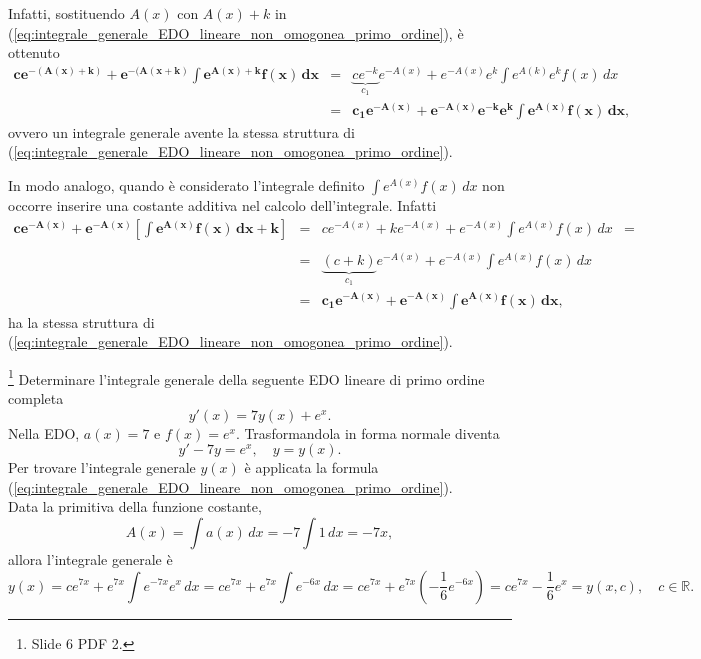 Infatti, sostituendo $A(x)$ con $A(x)+k$ in (\ref{eq:integrale_generale_EDO_lineare_non_omogonea_primo_ordine}), è ottenuto
\begin{equation*}
    \begin{matrix}
        \boldsymbol{ce^{-(A(x)+k)}+e^{-(A(x+k)}\int e^{A(x)+k}f(x)\, dx} &=& \underbrace{ce^{-k}}_{c_1}e^{-A(x)}+e^{-A(x)}e^{k}\int e^{A(k)} e^k f(x)\, dx\\
        &\boldsymbol=& \boldsymbol{c_1 e^{-A(x)}+e^{-A(x)} e^{-k}e^k\int e^{A(x)}f(x)\, dx,}
    \end{matrix}
\end{equation*}
ovvero un integrale generale avente la stessa struttura di (\ref{eq:integrale_generale_EDO_lineare_non_omogonea_primo_ordine}).

In modo analogo, quando è considerato l'integrale definito $\int e^{A(x)} f(x)\, dx$ non occorre inserire una costante additiva nel calcolo dell'integrale. Infatti
\begin{equation*}
    \begin{matrix}
        \boldsymbol{c e^{-A(x)}+e^{-A(x)}\left[\int e^{A(x)}f(x)\, dx+k\right]} &=& ce^{-A(x)}+ke^{-A(x)}+e^{-A(x)}\int e^{A(x)}f(x)\, dx &=&\\\\
        &=&\underbrace{(c+k)}_{c_1}e^{-A(x)} + e^{-A(x)}\int e^{A(x)}f(x)\, dx \\
        &\boldsymbol=& \boldsymbol{c_1 e^{-A(x)} + e^{-A(x)}\int e^{A(x)}f(x)\, dx},
    \end{matrix}
\end{equation*}
ha la stessa struttura di (\ref{eq:integrale_generale_EDO_lineare_non_omogonea_primo_ordine}).

\begin{example}\footnote{Slide 6 PDF 2.}
    Determinare l'integrale generale della seguente EDO lineare di primo ordine completa
    \begin{equation*}
        y'(x)=7y(x)+e^x.
    \end{equation*}
    Nella EDO, $a(x)=7$ e $f(x)=e^x$. Trasformandola in forma normale diventa
    \begin{equation*}
        y'-7y=e^x,\quad y=y(x).
    \end{equation*}
    Per trovare l'integrale generale $y(x)$ è applicata la formula (\ref{eq:integrale_generale_EDO_lineare_non_omogonea_primo_ordine}).\\
    Data la primitiva della funzione costante,
    \begin{equation*}
        A(x)=\int a(x)\, dx=-7\int 1\, dx=-7x,
    \end{equation*}
    allora l'integrale generale è
    \begin{equation*}
        y(x)=ce^{7x}+e^{7x}\int e^{-7x}e^x\, dx=ce^{7x}+e^{7x}\int e^{-6x}\, dx=c e^{7x}+e^{7x}\left(-\frac{1}{6}e^{-6x}\right)=ce^{7x}-\frac{1}{6}e^x=y(x,c),\quad c\in\mathbb R.
    \end{equation*}
\end{example}

